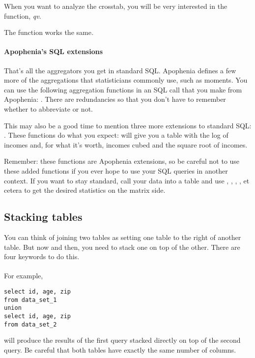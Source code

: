 When you want to analyze the crosstab, you will be very
interested in the  function, {\em qv}.

The function  works the same. 

\paragraph{Apophenia's SQL extensions}
That's all the aggregators you get in standard SQL.
Apophenia defines a few more of the aggregations that statisticians
commonly use, such as moments. You can use the following aggregation
functions in an SQL call that you make from Apophenia: . There are redundancies so that you
don't have to remember whether to abbreviate or not.

This may also be a good time to mention three more extensions to standard
SQL: . These functions do what you expect:
will give you a table with the log of incomes and, for what it's worth,
incomes cubed and the square root of incomes.

Remember: these functions are Apophenia extensions, so be careful not to
use these added functions if you ever hope to use your SQL queries in
another context. If you want to stay standard, call your data into
a table and use , ,
, , et cetera to get the desired
statistics on the matrix side.

\subsection{Stacking tables}
You can think of joining two tables as setting one table to the right of
another table. But now and then, you need to stack one on top of
the other. There are four keywords to do this.

\paragraph{} For example, 
\begin{lstlisting}
select id, age, zip
from data_set_1
union
select id, age, zip
from data_set_2
\end{lstlisting}
will produce the results of the first query stacked directly on top
of the second query. Be careful that both tables have exactly the same
number of columns.

